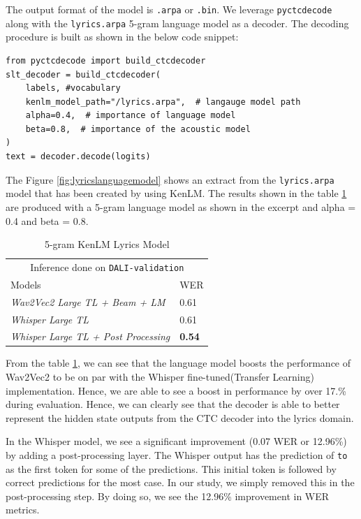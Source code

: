 The output format of the model is \texttt{.arpa} or \texttt{.bin}. We leverage \texttt{pyctcdecode} \cite{KenshoTechnologies} along with the \texttt{lyrics.arpa} 5-gram language model as a decoder. The decoding procedure is built as shown in the below code snippet\cite{KenshoTechnologies}:

\begin{verbatim}
from pyctcdecode import build_ctcdecoder
slt_decoder = build_ctcdecoder(
    labels, #vocabulary
    kenlm_model_path="/lyrics.arpa",  # langauge model path
    alpha=0.4,  # importance of language model
    beta=0.8,  # importance of the acoustic model
)
text = decoder.decode(logits)
\end{verbatim}

The Figure \ref{fig:lyricslanguagemodel} shows an extract from the \texttt{lyrics.arpa} model that has been created by using KenLM. The results shown in the table \ref{ngram-table} are produced with a 5-gram language model as shown in the excerpt and alpha = 0.4 and beta = 0.8.

\renewcommand{\arraystretch}{2}
\setlength{\arrayrulewidth}{0.3mm}
\begin{table}[H]
\small
\begin{center}
\begin{tabular}{ |p{7cm}| p{2cm}| }
\multicolumn{2}{c}{Inference done on \texttt{DALI-validation}} \\
\cline{1-2}
 Models     & WER  \\
\hline  \hline
\textit{Wav2Vec2 Large TL + Beam + LM} &  0.61  \\
\textit{Whisper Large TL} &  0.61  \\
\textit{Whisper Large TL + Post Processing}  & \textbf{0.54}\\
\hline  \hline
\end{tabular} 
\caption{\label{ngram-table} 5-gram KenLM Lyrics Model}
\end{center}
\end{table}


From the table \ref{ngram-table}, we can see that the language model boosts the performance of Wav2Vec2 to be on par with the Whisper fine-tuned(Transfer Learning) implementation. Hence, we are able to see a boost in performance by over 17.\% during evaluation. Hence, we can clearly see that the decoder is able to better represent the hidden state outputs from the CTC decoder into the lyrics domain.  

In the Whisper model, we see a significant improvement (0.07 WER or 12.96\%) by adding a post-processing layer. The Whisper output has the prediction of \texttt{to} as the first token for some of the predictions. This initial token is followed by correct predictions for the most case. In our study, we simply removed this in the post-processing step. By doing so, we see the 12.96\% improvement in WER metrics.

